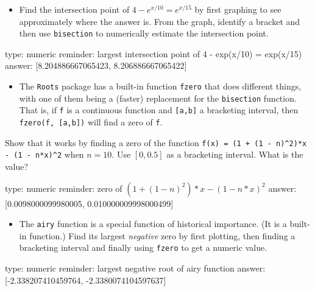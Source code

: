 \documentclass[12pt]{article}
\begin{document}
\begin{itemize}
\itemsep1pt\parskip0pt
\item
  Find the intersection point of $4 - e^{x/10} = e^{x/15}$ by first
  graphing to see approximately where the answer is. From the graph,
  identify a bracket and then use \texttt{bisection} to numerically
  estimate the intersection point.
\end{itemize}

\begin{answer}
    type: numeric
    reminder: largest intersection point of  4 - exp(x/10) = exp(x/15)
    answer: [8.204886667065423, 8.206886667065422]

\end{answer}

\begin{itemize}
\itemsep1pt\parskip0pt
\item
  The \texttt{Roots} package has a built-in function \texttt{fzero} that
  does different things, with one of them being a (faster) replacement
  for the \texttt{bisection} function. That is, if \texttt{f} is a
  continuous function and \texttt{{[}a,b{]}} a bracketing interval, then
  \texttt{fzero(f, {[}a,b{]})} will find a zero of \texttt{f}.
\end{itemize}

Show that it works by finding a zero of the function
\texttt{f(x) = (1 + (1 - n)\^{}2)*x - (1 - n*x)\^{}2} when $n=10$. Use
$[0, 0.5]$ as a bracketing interval. What is the value?

\begin{answer}
    type: numeric
    reminder: zero of  \( (1 + (1-n)^2)*x - (1-n*x)^2 \)
    answer: [0.0098000099980005, 0.010000009998000499]

\end{answer}

\begin{itemize}
\itemsep1pt\parskip0pt
\item
  The \texttt{airy} function is a special function of historical
  importance. (It is a built-in function.) Find its largest
  \emph{negative} zero by first plotting, then finding a bracketing
  interval and finally using \texttt{fzero} to get a numeric value.
\end{itemize}

\begin{answer}
    type: numeric
    reminder: largest negative root of airy function
    answer: [-2.338207410459764, -2.3380074104597637]

\end{answer}
\end{document}
